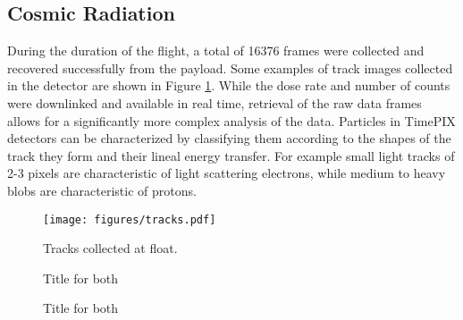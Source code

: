 \subsection{Cosmic Radiation}
\label{sec:Cosmic-Radiation-Results}

During the duration of the flight, a total of 16376 frames were collected and recovered successfully from the payload. Some examples of track images collected in the detector are shown in Figure \ref{tracks}. While the dose rate and number of counts were downlinked and available in real time, retrieval of the raw data frames allows for a significantly more complex analysis of the data. Particles in TimePIX detectors can be characterized by classifying them according to the shapes of the track they form and their lineal energy transfer. For example small light tracks of 2-3 pixels are characteristic of light scattering electrons, while medium to heavy blobs are characteristic of protons.

\begin{figure}[h!]
	\begin{center}
	\texttt{[image: figures/tracks.pdf]}
	\caption{Tracks collected at float.}
	\label{tracks}
	\end{center}
\end{figure}

\begin{figure}
\hfill
{}
\hfill
{}
\hfill
\caption{Title for both}
\end{figure}

\begin{figure}
\hfill
{}
\hfill
{}
\hfill
\caption{Title for both}
\end{figure}

